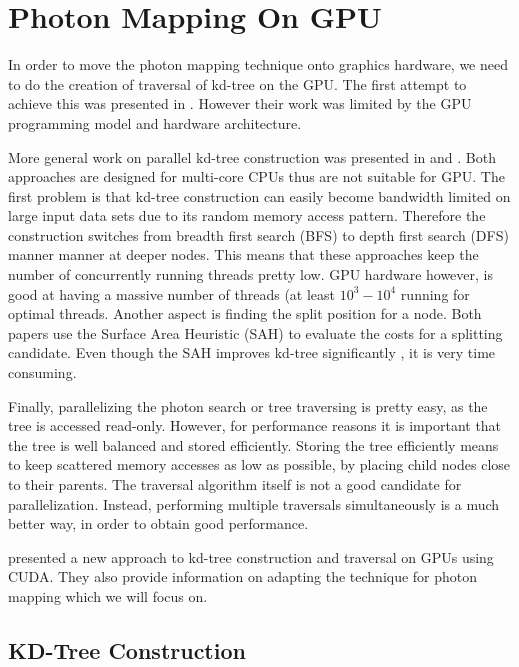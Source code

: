 
\section{Photon Mapping On GPU} 

In order to move the photon mapping technique onto graphics hardware, we need to do the creation of traversal of kd-tree on the GPU. The first attempt to achieve this was presented in \cite{Purcell:2005:PMP:1198555.1198797}. However their work was limited by the GPU programming model and hardware architecture. 

More general work on parallel kd-tree construction was presented in \cite{popov:06:ESC} and \cite{Shevtsov_highlyparallel}. Both approaches are designed for multi-core CPUs thus are not suitable for GPU. The first problem is that kd-tree construction can easily become bandwidth limited on large input data sets due to its random memory access pattern. Therefore the construction switches from breadth first search (BFS) to depth first search (DFS) manner manner at deeper nodes. This means that these approaches keep the number of concurrently running threads pretty low. GPU hardware however, is good at having a massive number of threads (at least \(10^{3} - 10^{4}\) running for optimal threads\cite{Guide2012}. Another aspect is finding the split position for a node. Both papers use the Surface Area Heuristic (SAH)\cite{springerlink:10.1007/BF01911006} to evaluate the costs for a splitting candidate. Even though the SAH improves kd-tree significantly \cite{wald::PhD}, it is very time consuming. 

Finally, parallelizing the photon search or tree traversing is pretty easy, as the tree is accessed read-only. However, for performance reasons it is important that the tree is well balanced and stored efficiently. Storing the tree efficiently means to keep scattered memory accesses as low as possible, by placing child nodes close to their parents. The traversal algorithm itself is not a good candidate for parallelization. Instead, performing multiple traversals simultaneously is a much better way, in order to obtain good performance. 

\citeauthor{Zhou2008} presented a new approach to kd-tree construction and traversal on GPUs using CUDA\cite{Zhou2008}. They also provide information on adapting the technique for photon mapping which we will focus on.

\subsection{KD-Tree Construction} \label{subsec:kdtree_construction} 

